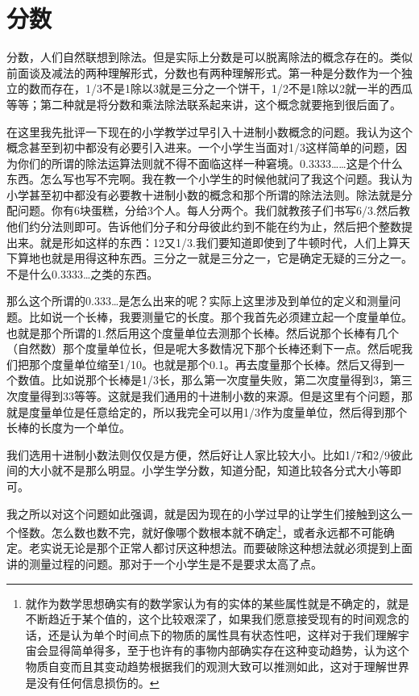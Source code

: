\documentclass[11pt,oneside]{article}
\begin{document}
\section{分数}
\label{sec-6}
分数，人们自然联想到除法。但是实际上分数是可以脱离除法的概念存在的。类似前面谈及减法的两种理解形式，分数也有两种理解形式。第一种是分数作为一个独立的数而存在，1/3不是1除以3就是三分之一个饼干，1/2不是1除以2就一半的西瓜等等；第二种就是将分数和乘法除法联系起来讲，这个概念就要拖到很后面了。

在这里我先批评一下现在的小学教学过早引入十进制小数概念的问题。我认为这个概念甚至到初中都没有必要引入进来。一个小学生当面对1/3这样简单的问题，因为你们的所谓的除法运算法则就不得不面临这样一种窘境。0.3333\ldots{}\ldots{}这是个什么东西。怎么写也写不完啊。我在教一个小学生的时候他就问了我这个问题。我认为小学甚至初中都没有必要教十进制小数的概念和那个所谓的除法法则。除法就是分配问题。你有6块蛋糕，分给3个人。每人分两个。我们就教孩子们书写6/3.然后教他们约分法则即可。告诉他们分子和分母彼此约到不能在约为止，然后把个整数提出来。就是形如这样的东西：12又1/3.我们要知道即使到了牛顿时代，人们上算天下算地也就是用得这种东西。三分之一就是三分之一，它是确定无疑的三分之一。不是什么0.3333\ldots{}之类的东西。

那么这个所谓的0.333\ldots{}是怎么出来的呢？实际上这里涉及到单位的定义和测量问题。比如说一个长棒，我要测量它的长度。那个我首先必须建立起一个度量单位。也就是那个所谓的1.然后用这个度量单位去测那个长棒。然后说那个长棒有几个（自然数）那个度量单位长，但是呢大多数情况下那个长棒还剩下一点。然后呢我们把那个度量单位缩至1/10。也就是那个0.1。再去度量那个长棒。然后又得到一个数值。比如说那个长棒是1/3长，那么第一次度量失败，第二次度量得到3，第三次度量得到33等等。这就是我们通用的十进制小数的来源。但是这里有个问题，那就是度量单位是任意给定的，所以我完全可以用1/3作为度量单位，然后得到那个长棒的长度为一个单位。

我们选用十进制小数法则仅仅是方便，然后好让人家比较大小。比如1/7和2/9彼此间的大小就不是那么明显。小学生学分数，知道分配，知道比较各分式大小等即可。

我之所以对这个问题如此强调，就是因为现在的小学过早的让学生们接触到这么一个怪数。怎么数也数不完，就好像哪个数根本就不确定\footnote{就作为数学思想确实有的数学家认为有的实体的某些属性就是不确定的，就是不断趋近于某个值的，这个比较艰深了，如果我们愿意接受现有的时间观念的话，还是认为单个时间点下的物质的属性具有状态性吧，这样对于我们理解宇宙会显得简单得多，至于也许有的事物内部确实存在这种变动趋势，认为这个物质自变而且其变动趋势根据我们的观测大致可以推测如此，这对于理解世界是没有任何信息损伤的。}，或者永远都不可能确定。老实说无论是那个正常人都讨厌这种想法。而要破除这种想法就必须提到上面讲的测量过程的问题。那对于一个小学生是不是要求太高了点。
\end{document}
